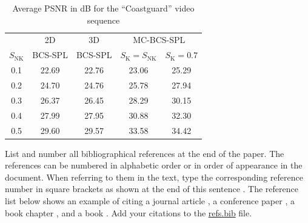 \documentclass[smallabstract,smallcaptions]{dccpaper}
\begin{document}
\begin{table}[tp]
\begin{center}
\caption{\label{tab:example}%
Average PSNR in dB for the ``Coastguard'' video sequence}
{
\renewcommand{\baselinestretch}{1}\footnotesize
\begin{tabular}{|c|c|c|c|c|}
\cline{2-5}
\multicolumn{1}{c|}{~}&
\multicolumn{1}{c|}{2D} &
\multicolumn{1}{c|}{3D} &
\multicolumn{2}{c|}{MC-BCS-SPL}\\
\cline{4-5}
\multicolumn{1}{c|}{$S_{\text{NK}}$} &
BCS-SPL & BCS-SPL & $S_{\text{K}}=S_{\text{NK}}$ & $S_{\text{K}}=0.7$\\
\hline
0.1 &22.69 &22.76 &23.06 &25.29 \\
0.2 &24.70 &24.76 &25.78 &27.94 \\
0.3 &26.37 &26.45 &28.29 &30.15 \\
0.4 &27.99 &27.95 &30.88 &32.30 \\
0.5 &29.60 &29.57 &33.58 &34.42 \\
\hline
\end{tabular}}
\end{center}
\end{table}


List and number all bibliographical references at the end of the
paper. The references can be numbered in alphabetic order or in
order of appearance in the document. When referring to them in
the text, type the corresponding reference number in square
brackets as shown at the end of this sentence \cite{Fow2009}.
The reference list below shows an example of citing a
journal article \cite{Fow2009}, a conference paper \cite{Fow2008},
a book chapter \cite{FD2011}, and a book \cite{Par1998}.
Add your citations to the \url{refs.bib} file.



\end{document}
